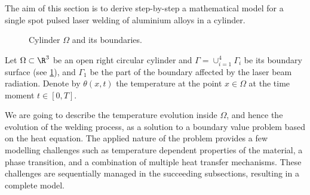 The aim of this section is to derive step-by-step a mathematical model for a single spot pulsed laser welding of aluminium alloys in a cylinder.

\begin{figure}[ht]
	\centering
	
	\caption{Cylinder $\Omega$ and its boundaries.}
	\label{fig:cylinder}
\end{figure}

Let $\Omega	\subset \R^3$ be an open right circular cylinder and $\Gamma = \cup_{i=1}^4 \Gamma_i$ be its boundary surface (see \cref{fig:cylinder}), and $\Gamma_1$ be the part of the boundary affected by the laser beam radiation.
Denote by $\theta(x,t)$ the temperature at the point $x \in \Omega$ at the time moment $t \in [0,T]$.

We are going to describe the temperature evolution inside $\Omega$, and hence the evolution of the welding process, as a solution to a boundary value problem based on the heat equation.
The applied nature of the problem provides a few modelling challenges such as temperature dependent properties of the material, a phase transition, and a combination of multiple heat transfer mechanisms.
These challenges are sequentially managed in the succeeding subsections, resulting in a complete model.



